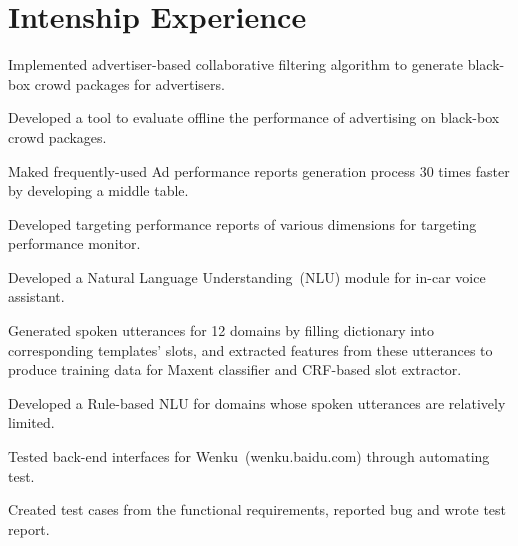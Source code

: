 \documentclass[11pt,a4paper]{resume}
\begin{document}
\section{Intenship Experience}
\begin{workitemize}
  \item Implemented advertiser-based collaborative filtering algorithm to
    generate black-box crowd packages for advertisers.
  \item Developed a tool to evaluate offline the performance of advertising on
    black-box crowd packages.
  \item Maked frequently-used Ad performance reports generation process 30
    times faster by developing a middle table.
  \item Developed targeting performance reports of various dimensions for
    targeting performance monitor.
\end{workitemize}

\begin{workitemize}
  \item Developed a Natural Language Understanding~(NLU) module for in-car
    voice assistant.
  \item Generated spoken utterances for 12 domains by filling dictionary into
    corresponding templates' slots, and extracted features from these utterances
    to produce training data for Maxent classifier and CRF-based slot extractor.
  \item Developed a Rule-based NLU for domains whose spoken utterances are
    relatively limited.
\end{workitemize}

\begin{workitemize}
  \item Tested back-end interfaces for Wenku~(wenku.baidu.com) through
    automating test.
  \item Created test cases from the functional requirements, reported bug and
    wrote test report.
\end{workitemize}
\end{document}
